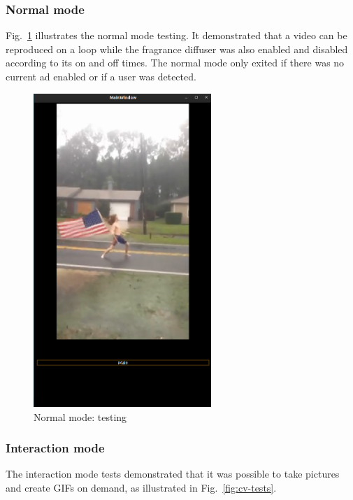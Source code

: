 \subsubsection{Normal mode}
\label{sec:normal-mode}
Fig.~\ref{fig:normal-mode-test} illustrates the normal mode testing. It
demonstrated that a video can be reproduced on a loop while the fragrance
diffuser was also enabled and disabled according to its on and off times. The
normal mode only exited if there was no current ad enabled or if a user was
detected.
%
\begin{figure}[htb!]
\centering
    \includegraphics[width=0.6\textwidth]{./img/ui-test-normal-mode.png}
  \caption{Normal mode: testing}%
\label{fig:normal-mode-test}
\end{figure}

\subsubsection{Interaction mode}
\label{sec:interaction-mode}
The interaction mode tests demonstrated that it was possible to take pictures
and create GIFs on demand, as illustrated in Fig.~\ref{fig:cv-tests}.


